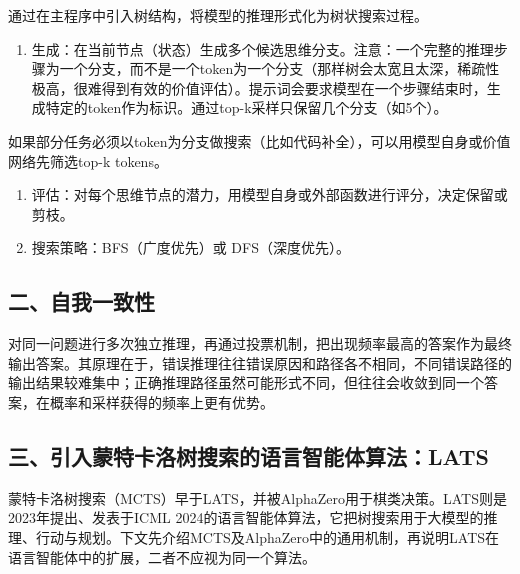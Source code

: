 通过在主程序中引入树结构，将模型的推理形式化为树状搜索过程。

\begin{enumerate}
\def\labelenumi{\arabic{enumi}.}
\tightlist
\item
  生成：在当前节点（状态）生成多个候选思维分支。注意：一个完整的推理步骤为一个分支，而不是一个token为一个分支（那样树会太宽且太深，稀疏性极高，很难得到有效的价值评估）。提示词会要求模型在一个步骤结束时，生成特定的token作为标识。通过top-k采样只保留几个分支（如5个）。
\end{enumerate}

如果部分任务必须以token为分支做搜索（比如代码补全），可以用模型自身或价值网络先筛选top-k tokens。

\begin{enumerate}
\def\labelenumi{\arabic{enumi}.}
\setcounter{enumi}{1}
\item
  评估：对每个思维节点的潜力，用模型自身或外部函数进行评分，决定保留或剪枝。
\item
  搜索策略：BFS（广度优先）或 DFS（深度优先）。
\end{enumerate}

\hypertarget{ux4e8cux81eaux6211ux4e00ux81f4ux6027}{%
\subsection{二、自我一致性}\label{ux4e8cux81eaux6211ux4e00ux81f4ux6027}}

对同一问题进行多次独立推理，再通过投票机制，把出现频率最高的答案作为最终输出答案。其原理在于，错误推理往往错误原因和路径各不相同，不同错误路径的输出结果较难集中；正确推理路径虽然可能形式不同，但往往会收敛到同一个答案，在概率和采样获得的频率上更有优势。

\hypertarget{ux4e09ux5f15ux5165ux8499ux7279ux5361ux6d1bux6811ux641cux7d22ux7684ux8bedux8a00ux667aux80fdux4f53ux7b97ux6cd5lats}{%
\subsection{三、引入蒙特卡洛树搜索的语言智能体算法：LATS}\label{ux4e09ux5f15ux5165ux8499ux7279ux5361ux6d1bux6811ux641cux7d22ux7684ux8bedux8a00ux667aux80fdux4f53ux7b97ux6cd5lats}}

蒙特卡洛树搜索（MCTS）早于LATS，并被AlphaZero用于棋类决策。LATS则是2023年提出、发表于ICML 2024的语言智能体算法，它把树搜索用于大模型的推理、行动与规划。下文先介绍MCTS及AlphaZero中的通用机制，再说明LATS在语言智能体中的扩展，二者不应视为同一个算法。

